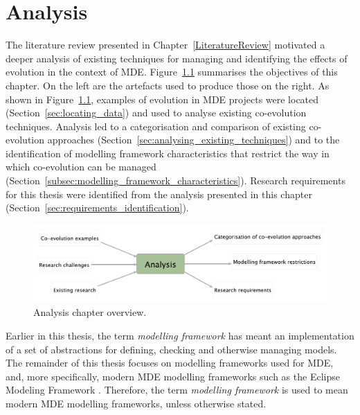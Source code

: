 
\chapter{Analysis}
\label{Analysis}
The literature review presented in Chapter~\ref{LiteratureReview} motivated a deeper analysis of existing techniques for managing and identifying the effects of evolution in the context of MDE. Figure~\ref{fig:analysis_overview} summarises the objectives of this chapter. On the left are the artefacts used to produce those on the right. As shown in Figure~\ref{fig:analysis_overview}, examples of evolution in MDE projects were located (Section~\ref{sec:locating_data}) and used to analyse existing co-evolution techniques. Analysis led to a categorisation and comparison of existing co-evolution approaches (Section~\ref{sec:analysing_existing_techniques}) and to the identification of modelling framework characteristics that restrict the way in which co-evolution can be managed (Section~\ref{subsec:modelling_framework_characteristics}). Research requirements for this thesis were identified from the analysis presented in this chapter (Section~\ref{sec:requirements_identification}).


\begin{figure}[htbp]
  \begin{center}
    \leavevmode
    \includegraphics[width=12cm]{4.Analysis/overview.pdf}
  \end{center}
  \caption{Analysis chapter overview.}
  \label{fig:analysis_overview}
\end{figure}

Earlier in this thesis, the term \emph{modelling framework} has meant an implementation of a set of abstractions for defining, checking and otherwise managing models. The remainder of this thesis focuses on modelling frameworks used for MDE, and, more specifically, modern MDE modelling frameworks such as the Eclipse Modeling Framework \cite{steinberg09emf}. Therefore, the term \emph{modelling framework} is used to mean modern MDE modelling frameworks, unless otherwise stated.


